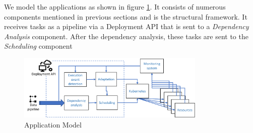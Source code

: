 

        We model the applications as shown in figure \ref{fig:application-model}.
        It consists of numerous components mentioned in previous sections and is the structural framework.
        It receives tasks as a pipeline via a Deployment API that is sent to a \emph{Dependency Analysis} component.
        After the dependency analysis, these tasks are sent to the \emph{Scheduling} component

        \begin{figure}
            \centering
            \includegraphics[width=0.8\textwidth]{pdf/data_cloud_arch.pdf}
            \caption{Application Model}
            \label{fig:application-model}
        \end{figure}